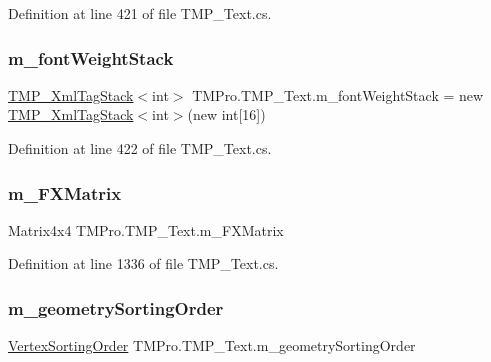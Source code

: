 Definition at line 421 of file T\+M\+P\+\_\+\+Text.\+cs.

\mbox{\label{class_t_m_pro_1_1_t_m_p___text_a700d2eddd6bbf9cb5756b29f6b8e6bc4}} 
\subsubsection{\texorpdfstring{m\_fontWeightStack}{m\_fontWeightStack}}
{\footnotesize\ttfamily \mbox{\hyperlink{struct_t_m_pro_1_1_t_m_p___xml_tag_stack}{T\+M\+P\+\_\+\+Xml\+Tag\+Stack}}$<$int$>$ T\+M\+Pro.\+T\+M\+P\+\_\+\+Text.\+m\+\_\+font\+Weight\+Stack = new \mbox{\hyperlink{struct_t_m_pro_1_1_t_m_p___xml_tag_stack}{T\+M\+P\+\_\+\+Xml\+Tag\+Stack}}$<$int$>$(new int\mbox{[}16\mbox{]})\hspace{0.3cm}{\ttfamily [protected]}}



Definition at line 422 of file T\+M\+P\+\_\+\+Text.\+cs.

\mbox{\label{class_t_m_pro_1_1_t_m_p___text_a5bd69aba74fc6ededecb5143204d83af}} 
\subsubsection{\texorpdfstring{m\_FXMatrix}{m\_FXMatrix}}
{\footnotesize\ttfamily Matrix4x4 T\+M\+Pro.\+T\+M\+P\+\_\+\+Text.\+m\+\_\+\+F\+X\+Matrix\hspace{0.3cm}{\ttfamily [protected]}}



Definition at line 1336 of file T\+M\+P\+\_\+\+Text.\+cs.

\mbox{\label{class_t_m_pro_1_1_t_m_p___text_afbf9084adc5df057211b0cc6dc5a7013}} 
\subsubsection{\texorpdfstring{m\_geometrySortingOrder}{m\_geometrySortingOrder}}
{\footnotesize\ttfamily \mbox{\hyperlink{namespace_t_m_pro_a29c2b2e41c29850d1bc0760ac64b1ee0}{Vertex\+Sorting\+Order}} T\+M\+Pro.\+T\+M\+P\+\_\+\+Text.\+m\+\_\+geometry\+Sorting\+Order\hspace{0.3cm}{\ttfamily [protected]}}



